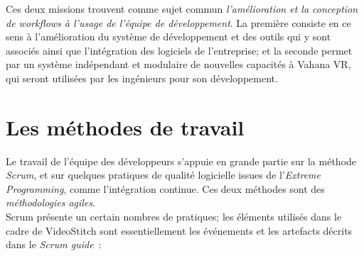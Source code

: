 Ces deux missions trouvent comme sujet commun \emph{l'amélioration et la conception 
de \textit{workflows} à l'usage de l'équipe de développement}. La première consiste en 
ce sens à l'amélioration du système de développement et des outils qui y sont associés ainsi que l'intégration des logiciels
de l'entreprise; et la seconde permet par un système indépendant et modulaire de
nouvelles capacités à Vahana VR, qui seront utilisées par les ingénieurs pour son développement.

\section{Les méthodes de travail}
Le travail de l'équipe des développeurs s'appuie en grande partie sur la méthode \emph{Scrum}, et
sur quelques pratiques de qualité logicielle issues de l'\textit{Extreme Programming}, comme l'intégration continue.
Ces deux méthodes sont des \emph{méthodologies agiles}\cite{methode-agile}.\\
\newline
Scrum présente un certain nombres de pratiques; les éléments utilisés 
dans le cadre de VideoStitch sont essentiellement les événements et les artefacts 
décrits dans le \textit{Scrum guide}\cite{scrum-guide}~:
